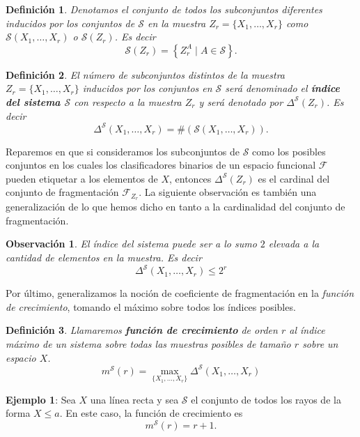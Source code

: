 \documentclass{report}
\newtheorem{dfn}{Definición}[section]
\newtheorem{obs}{Observación}[section]
\begin{document}
\begin{dfn}
Denotamos el conjunto de todos los subconjuntos diferentes inducidos por los 
conjuntos de \( \mathcal{S} \) en la muestra \( Z_r = \{X_1, \dots, X_r\} \) como \( \mathcal{S}(X_1, \dots, X_r) \) 
o \( \mathcal{S}(Z_r) \). Es decir
\[
    \mathcal{S}(Z_r) =  \left\{Z_r^A \mid A \in \mathcal{S}\right\}.
\]
\end{dfn}
\bigskip

\begin{dfn}
El número de subconjuntos distintos de la muestra \( Z_r = \{X_1, \dots, X_r\} \) 
inducidos por los conjuntos en \( \mathcal{S} \) será denominado el \textbf{índice 
del sistema \( \mathcal{S} \)} con respecto a la muestra \( Z_r \) 
y será denotado por $\Delta^{\mathcal{S}}(Z_r)$. Es decir
\[
\Delta^{\mathcal{S}}(X_1, \dots, X_r) = \#\left(\mathcal{S}(X_1, \dots, X_r)\right).
\]
\end{dfn}

Reparemos en que si consideramos los subconjuntos de $\mathcal{S}$ como los posibles conjuntos en
los cuales los clasificadores binarios de un espacio funcional $\mathcal{F}$ pueden etiquetar a los
elementos de $X$, entonces $\Delta^{\mathcal{S}}(Z_r)$ es el cardinal del conjunto de fragmentación $\mathcal{F}_{Z_r}$.
La siguiente observación es también una generalización
de lo que hemos dicho en tanto a la cardinalidad del conjunto de fragmentación.\newline


\begin{obs} El índice del sistema puede ser a lo sumo $2$ elevada a la cantidad de elementos en la muestra. Es decir
\[
    \Delta^{\mathcal{S}}(X_1, \dots, X_r) \leq 2^r
\]
\end{obs}

Por último, generalizamos la noción de coeficiente de fragmentación en la \textit{función de crecimiento},
tomando el máximo sobre todos los índices posibles.\newline

\begin{dfn}
    Llamaremos \textbf{función de crecimiento} de orden $r$ al índice máximo de un sistema sobre todas las muestras
    posibles de tamaño $r$ sobre un espacio $X$. 
    \[
    m^{\mathcal{S}}(r) = \max_{\{X_1,\dots,X_r\}}\Delta^{\mathcal{S}}(X_1,\dots,X_r)
    \]
\end{dfn}
\bigskip

\textbf{Ejemplo 1}: Sea \( X \) una línea recta y sea \( \mathcal{S} \) el conjunto 
de todos los rayos de la forma \( X \leq a \). En este caso, la función de crecimiento es  
\[
m^{\mathcal{S}}(r) = r + 1.
\]
\end{document}
